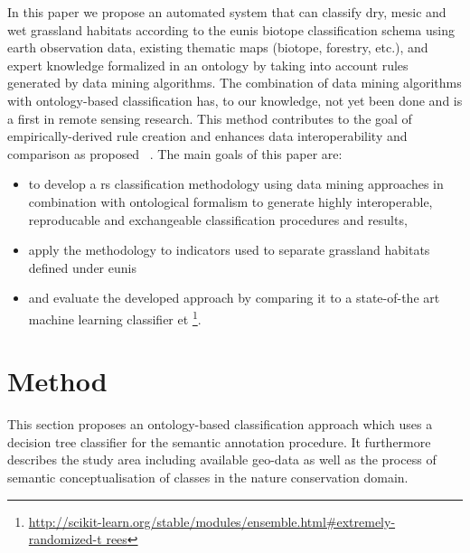 \documentclass[authoryear,final,12pt,number]{elsarticle}
\begin{document}
In this paper we propose an automated system that can classify dry, mesic and 
wet grassland habitats according to the \gls{eunis} biotope classification 
schema using earth observation data, existing thematic maps (biotope, forestry, 
etc.), and expert knowledge formalized in an ontology by taking into account 
rules generated by data mining algorithms. The combination of data mining 
algorithms with ontology-based classification has, to our knowledge, not yet 
been done and is a first in remote sensing research. This method contributes to 
the goal of empirically-derived rule creation and enhances data 
interoperability and comparison as proposed ~\cite{Janowicz2012}. The main 
goals of this paper are:
\begin{itemize}
 \item to develop a \gls{rs} classification methodology using data mining 
approaches
     in combination with ontological formalism to generate highly interoperable,
     reproducable and exchangeable classification procedures and results,
 \item apply the methodology to indicators used to separate grassland habitats
     defined under \gls{eunis}
 \item and evaluate the developed approach by comparing it to a state-of-the art
     machine learning classifier \gls{et}
\footnote{\url{
http://scikit-learn.org/stable/modules/ensemble.html\#extremely-randomized-t
rees}}.
\end{itemize}

\section{Method}
This section proposes an ontology-based classification approach which uses a
decision tree classifier for the semantic annotation procedure. It furthermore
describes the study area including available geo-data as well as the process of
semantic conceptualisation of classes in the nature conservation domain. 
\end{document}
